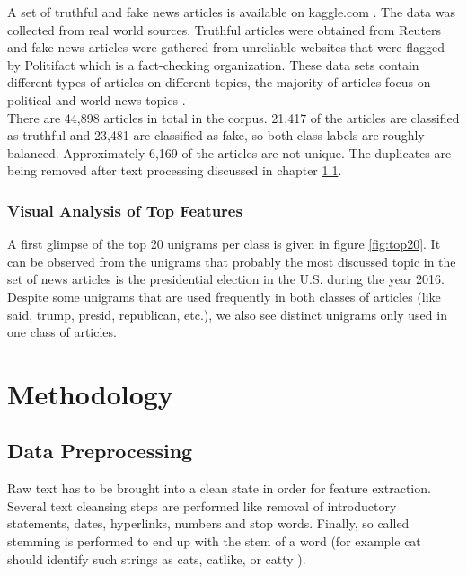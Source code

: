 \documentclass[a4paper,12pt,nottoc]{article}
\begin{document}
A set of truthful and fake news articles is available on kaggle.com \cite{bib:kaggle}. The data was collected from real world sources. Truthful articles were obtained from Reuters and fake news articles were gathered from unreliable websites that were flagged by Politifact which is a fact-checking organization. These data sets contain different types of articles on different topics, the majority of articles focus on political and world news topics \cite{bib:ahmed-2018}.\\

\noindent There are 44,898 articles in total in the corpus. 21,417 of the articles are classified as truthful and 23,481 are classified as fake, so both class labels are roughly balanced. Approximately 6,169 of the articles are not unique. The duplicates are being removed after text processing discussed in chapter \ref{chap:data-preproc}.

\subsubsection{Visual Analysis of Top Features}

A first glimpse of the top 20 unigrams per class is given in figure \ref{fig:top20}. It can be observed from the unigrams that probably the most discussed topic in the set of news articles is the presidential election in the U.S. during the year 2016. Despite some unigrams that are used frequently in both classes of articles (like said, trump, presid, republican, etc.), we also see distinct unigrams only used in one class of articles. 

\clearpage
\section{Methodology}

\subsection{Data Preprocessing}\label{chap:data-preproc}

Raw text has to be brought into a clean state in order for feature extraction. Several text cleansing steps are performed like removal of introductory statements, dates, hyperlinks, numbers and stop words. Finally, so called stemming is performed to end up with the stem of a word (for example cat should identify such strings as cats, catlike, or catty \cite{bib:stemming}).
\end{document}
